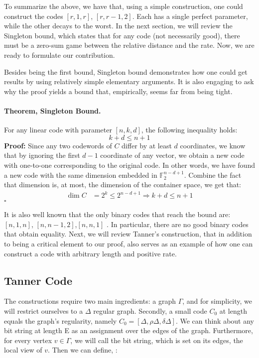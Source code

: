 \documentclass[sigplan,screen]{acmart}
\begin{document}
\begin{multicols*}{2}
  To summarize the above, we have that, using a simple construction, one could construct the codes $[r, 1, r]$, $[r, r-1, 2]$. Each has a single perfect parameter, while the other decays to the worst. In the next section, we will review the Singleton bound, which states that for any code (not necessarily good), there must be a zero-sum game between the relative distance and the rate.
  Now, we are ready to formulate our contribution. 


  Besides being the first bound, Singleton bound demonstrates how one could get results by using relatively simple elementary arguments. It is also engaging to ask why the proof yields a bound that, empirically, seems far from being tight.
  \paragraph{Theorem, Singleton Bound.} For any linear code with parameter $[n,k,d]$, the following inequality holds:
  \begin{equation*}
    k+ d \le n + 1
  \end{equation*} 
  \textbf{Proof:} Since any two codewords of $C$ differ by at least $d$ coordinates, we know that by ignoring the first $d-1$ coordinate of any vector, we obtain a new code with one-to-one corresponding to the original code. In other words, we have found a new code with the same dimension embedded in $\mathbb{F}_{2}^{n-d+1}$. Combine the fact that dimension is, at most, the dimension of the container space, we get that:  
  \begin{equation*}
    \begin{split}
      \dim C &= 2^{k} \le 2^{n-d+1} \Rightarrow k+d \le n + 1
    \end{split}
  \end{equation*}
  $\square$

  It is also well known that the only binary codes that reach the bound are: $[n,1,n]$, $[n,n-1,2]$,$[n,n,1]$ \cite{eczoo_mds}. In particular, there are no good binary codes that obtain equality. Next, we will review Tanner's construction, that in addition to being a critical element to our proof, also serves as an example of how one can construct a code with arbitrary length and positive rate.
  \subsection{Tanner Code}
  The constructions require two main ingredients: a graph $\Gamma$, and for simplicity, we will restrict ourselves to a $\Delta$ regular graph. Secondly, a small code $C_{0}$ at length equals the graph's regularity, namely $C_{0} = [\Delta,\rho\Delta, \delta\Delta]$. We can think about any bit string at length E as an assignment over the edges of the graph. Furthermore, for every vertex $v \in \Gamma$, we will call the bit string, which is set on its edges, the local view of $v$. Then we can define, \cite{Tanner}:

\end{multicols*}
\end{document}
